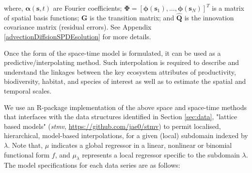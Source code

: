 \documentclass[letterpaper,portrait,11pt]{scrartcl}
\numberwithin{equation}{section}    %
\numberwithin{figure}{section}    %
\numberwithin{table}{section}       %
\begin{document}
  where, $\bm{\alpha} (\bm{s},t)$ are Fourier coefficients; $\bm{\Phi}=[ \bm{\phi}(\bm{s}_1), \dots, \bm{\phi}(\bm{s}_N) ]^T$ is a matrix of spatial basis functions; $\bm{G}$ is the transition matrix; and $\bm{\hat{Q}}$ is the innovation covariance matrix (residual errors). See Appendix \ref{advectionDiffsionSPDEsolution} for more details.


Once the form of the space-time model is formulated, it can be used as a predictive/interpolating method. Such interpolation is required to describe and understand the linkages between the key ecosystem attributes of productivity, biodiversity, habitat, and  species of interest as well as to estimate the spatial and temporal scales.

We use an R-package implementation of the above space and space-time methods that interfaces with the data structures identified in Section \ref{sec:data}, "lattice based models" (\textit{stmv},  \url{https://github.com/jae0/stmv}) to permit localised, hierarchical, model-based interpolations, for a given (local) subdomain indexed by $\lambda$. Note that, $\mu$ indicates a global regressor in a linear, nonlinear or binomial functional form $f$, and $\mu_\lambda$ represents a local regressor specific to the subdomain $\lambda$. The model specifications for each data series are as follows:
\end{document}
